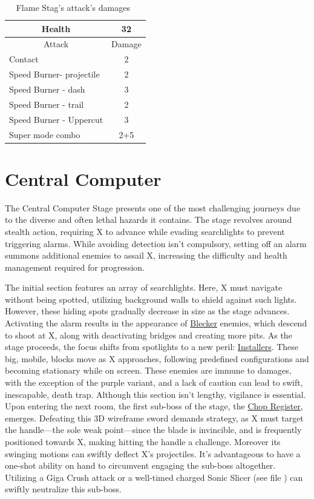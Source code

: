 \begin{table}[htp]
	\centering
	\begin{tabular}[h]{l c}
		
		\toprule
		\multicolumn{1}{c}{Health}  & 32 \\
		\midrule
		\multicolumn{1}{c}{Attack} & \multicolumn{1}{c}{Damage}\\
		Contact & 2 \\
		Speed Burner- projectile& 2\\
		Speed Burner - dash& 3\\
		Speed Burner - trail& 2\\
		Speed Burner - Uppercut& 3\\
		Super mode combo & 2+5\\
		\bottomrule
	\end{tabular}
	\caption{Flame Stag's attack's damages~\cite{wiki:Flame_stag}}
\end{table}
\section{Central Computer}
The Central Computer Stage presents one of the most challenging journeys due to the diverse and often lethal hazards it contains. The stage revolves around stealth action, requiring X to advance while evading searchlights to prevent triggering alarms. While avoiding detection isn't compulsory, setting off an alarm summons additional enemies to assail X, increasing the difficulty and health management required for progression.

The initial section features an array of searchlights. Here, X must navigate without being spotted, utilizing background walls to shield against such lights. However, these hiding spots gradually decrease in size as the stage advances. Activating the alarm results in the appearance of \hyperlink{enem:Blecker}{Blecker} enemies, which descend to shoot at X, along with deactivating bridges and creating more pits. As the stage proceeds, the focus shifts from spotlights to a new peril: \hyperlink{enem:Installer}{Installers}. These big, mobile, blocks move as X approaches, following predefined configurations and becoming stationary while on screen. These enemies are immune to damages, with the exception of the purple variant, and a lack of caution can lead to swift, inescapable, death trap. Although this section isn't lengthy, vigilance is essential. Upon entering the next room, the first sub-boss of the stage, the \hyperlink{miniboss:Chop_Register}{Chop Register}, emerges. Defeating this 3D wireframe sword demands strategy, as X must target the handle—the sole weak point—since the blade is invincible, and is frequently positioned towards X, making hitting the handle a challenge. Moreover its swinging motions can swiftly deflect X's projectiles. It's advantageous to have a one-shot ability on hand to circumvent engaging the sub-boss altogether. Utilizing a Giga Crush attack or a well-timed charged Sonic Slicer (see file  ) can swiftly neutralize this sub-boss.

